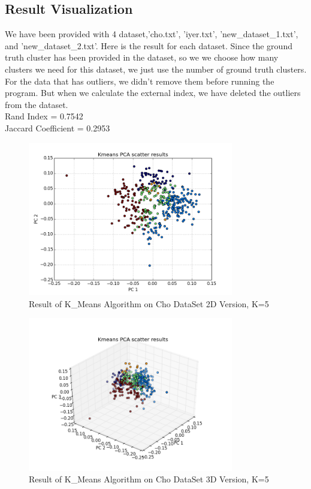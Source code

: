 \documentclass[paper=letter, fontsize=11pt]{article}
\numberwithin{equation}{section}		%
\numberwithin{figure}{section}			%
\numberwithin{table}{section}				%
\begin{document}
\subsection{Result Visualization}
We have been provided with 4 dataset,'cho.txt', 'iyer.txt', 'new\_dataset\_1.txt', and 'new\_dataset\_2.txt'. Here is the result for each dataset. Since the ground truth cluster has been provided in the dataset, so we we choose how many clusters we need for this dataset, we just use the number of ground truth clusters.\\
For the data that has outliers, we didn't remove them before running the program. But when we calculate the external index, we have deleted the outliers from the dataset.\\
\noindent Rand Index = 0.7542\\
Jaccard Coefficient = 0.2953\\
\begin{figure}[H]
	\centering
	\includegraphics[width=0.8\textwidth]{K_cho_2D}
	\caption{Result of K\_Means Algorithm on Cho DataSet 2D Version, K=5}
\end{figure}
\begin{figure}[H]
	\centering
	\includegraphics[width=0.8\textwidth]{K_cho_3D}
	\caption{Result of K\_Means Algorithm on Cho DataSet 3D Version, K=5}
\end{figure}
\end{document}
